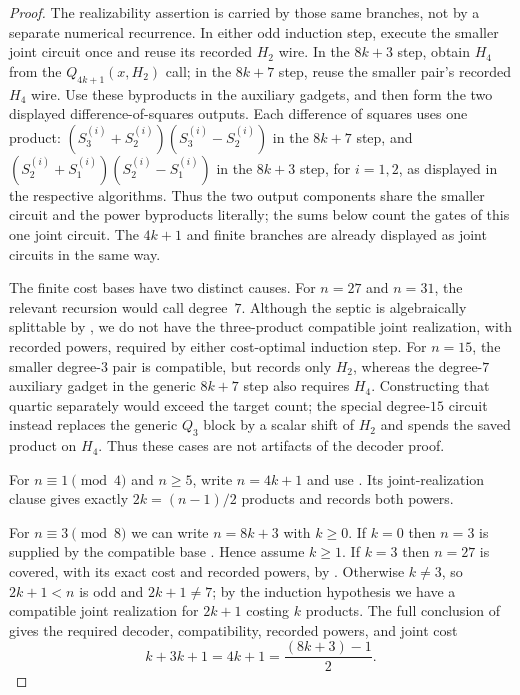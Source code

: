 \begin{proof}
    The realizability assertion is carried by those same branches, not by a
    separate numerical recurrence.  In either odd induction step, execute the
    smaller joint circuit once and reuse its recorded $H_2$ wire.  In the
    $8k+3$ step, obtain $H_4$ from the $Q_{4k+1}(x,H_2)$ call; in the
    $8k+7$ step, reuse the smaller pair's recorded $H_4$ wire.  Use these
    byproducts in the auxiliary gadgets, and then form the two displayed
    difference-of-squares outputs.  Each difference of squares uses one
    product: $(S^{(i)}_3+S^{(i)}_2)(S^{(i)}_3-S^{(i)}_2)$ in the $8k+7$
    step, and $(S^{(i)}_2+S^{(i)}_1)(S^{(i)}_2-S^{(i)}_1)$ in the $8k+3$
    step, for $i=1,2$, as displayed in the respective algorithms.
    Thus the two output components share the smaller circuit and the power
    byproducts literally; the sums below count the gates of this one joint
    circuit.  The $4k+1$ and finite branches are already displayed as joint
    circuits in the same way.

    The finite cost bases have two distinct causes.  For $n=27$ and
    $n=31$, the relevant recursion would call degree~$7$.  Although the
    septic is algebraically splittable by , we do
    not have the three-product compatible joint realization, with recorded
    powers, required by either cost-optimal induction step.  For $n=15$, the smaller degree-$3$
    pair is compatible, but records only $H_2$, whereas the degree-$7$
    auxiliary gadget in the generic $8k+7$ step also requires $H_4$.
    Constructing that quartic separately would exceed the target count; the
    special degree-$15$ circuit instead replaces the generic $Q_3$ block by a
    scalar shift of $H_2$ and spends the saved product on $H_4$.  Thus these
    cases are not artifacts of the decoder proof.

    For $n\equiv 1\pmod 4$ and $n\ge 5$, write $n=4k+1$ and use
    .  Its joint-realization clause gives exactly
    $2k=(n-1)/2$ products and records both powers.

    For $n\equiv 3\pmod 8$ we can write $n=8k+3$ with $k\ge 0$.
    If $k=0$ then $n=3$ is supplied by the compatible base
    .  Hence assume $k\ge1$.
    If $k=3$ then $n=27$ is covered, with its exact cost and recorded powers,
    by .
    Otherwise $k\ne 3$, so $2k+1<n$ is odd and $2k+1\ne 7$; by the induction
    hypothesis we have a compatible joint realization for $2k+1$ costing
    $k$ products.  The full conclusion of  gives
    the required decoder, compatibility, recorded powers, and joint cost
    \[
       k+3k+1=4k+1=\frac{(8k+3)-1}{2}.
    \]


\end{proof}
